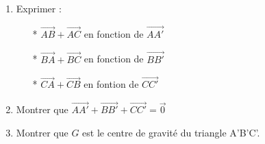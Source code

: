 \begin{enumerate}


\item  Exprimer :

\begin{itemize}
\item[*] $\overrightarrow{AB} + \overrightarrow{AC} $ en fonction de $\overrightarrow{AA'}$\\
\item[*] $\overrightarrow{BA} + \overrightarrow{BC}$ en fonction de $\overrightarrow{BB'}$\\
\item[*] $\overrightarrow{CA} + \overrightarrow{CB}$ en fontion de $\overrightarrow{CC'}$\\
\end{itemize}

\item Montrer que $\overrightarrow{AA'} + \overrightarrow{BB'} + \overrightarrow{CC'} = \overrightarrow{0} $

\item  Montrer que $G$ est le centre de gravité du triangle A'B'C'.
\end{enumerate}



